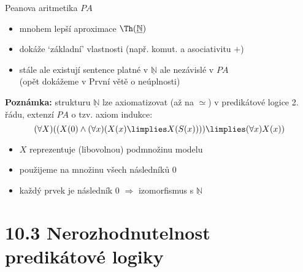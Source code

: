 \documentclass{beamer}
\begin{document}
\begin{frame}{Peanova aritmetika $PA$}    

    \pause

    \pause
    \begin{itemize}
        \item mnohem lepší aproximace $\Th(\underline{\mathbb N})$\pause
        \item dokáže `základní' vlastnosti (např. komut. a asociativitu $+$) \item stále ale existují sentence platné v $\underline{\mathbb N}$ ale nezávislé v $PA$\\(opět dokážeme v První větě o neúplnosti)
    \end{itemize}

    \bigskip

    \pause
    \textbf{Poznámka:} strukturu $\underline{\mathbb N}$ lze axiomatizovat (až na $\simeq$) v predikátové logice \alert{2. řádu}, extenzí $PA$ o tzv. \alert{axiom indukce}:
    $$
    (\forall X)((X(0) \land (\forall x)(X(x) \limplies X(S(x)))) \limplies (\forall x)X(x))
    $$

    \pause
    \begin{itemize}
        \item $X$ reprezentuje (libovolnou) podmnožinu modelu\pause
        \item použijeme na množinu všech následníků 0\pause
        \item každý prvek je následník 0 $\Rightarrow$ izomorfismus s $\underline{\mathbb N}$
    \end{itemize}

\end{frame}


\section{10.3 Nerozhodnutelnost predikátové logiky}
\end{document}
